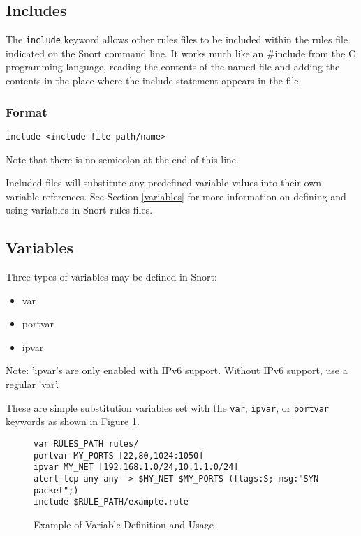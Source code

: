 \documentclass[english]{report}
\newenvironment{note}{
\samepage
    \vspace{10pt}{\textsf{
        {\hspace{7pt}\Huge{$\triangle$\hspace{-12.5pt}{\Large{$^!$}}}}\hspace{5pt}
        {\Large{NOTE}}
    }
    }
   \begin{center}
    \par\vspace{-17pt}

    \begin{lrbox}{\savepar}
    \begin{minipage}[r]{6in}
}
{
    \end{minipage}
    \end{lrbox}
    \fbox{
        \usebox{
            \savepar
	}
    }
    \par\vskip10pt
    \end{center}
}
\begin{document}
\subsection{Includes}

The {\tt include} keyword allows other rules files to be included within the rules
file indicated on the Snort command line. It works much like an \#include from
the C programming language, reading the contents of the named file and adding the contents
in the place where the include statement appears in the file.

\subsubsection{Format}
\begin{verbatim}
include <include file path/name>
\end{verbatim}

\begin{note}
Note that there is no semicolon at the end of this line. 
\end{note}

Included files will
substitute any predefined variable values into their own variable references.
See Section \ref{variables} for more information on defining and
using variables in Snort rules files.

\subsection{Variables \label{variables}}

Three types of variables may be defined in Snort:

\begin{itemize}
\item var
\item portvar
\item ipvar
\end{itemize}

\begin{note}
Note: 'ipvar's are only enabled with IPv6 support. Without IPv6 support, use a
regular 'var'.
\end{note}

These are simple substitution variables set with the {\tt var}, {\tt ipvar}, 
or {\tt portvar} keywords as shown in Figure \ref{variable definition}.


\begin{figure}[!hbpt]
\begin{verbatim}
var RULES_PATH rules/
portvar MY_PORTS [22,80,1024:1050]
ipvar MY_NET [192.168.1.0/24,10.1.1.0/24]
alert tcp any any -> $MY_NET $MY_PORTS (flags:S; msg:"SYN packet";)
include $RULE_PATH/example.rule
\end{verbatim}
\caption{Example of Variable Definition and Usage\label{variable definition}}
\end{figure}
\end{document}
